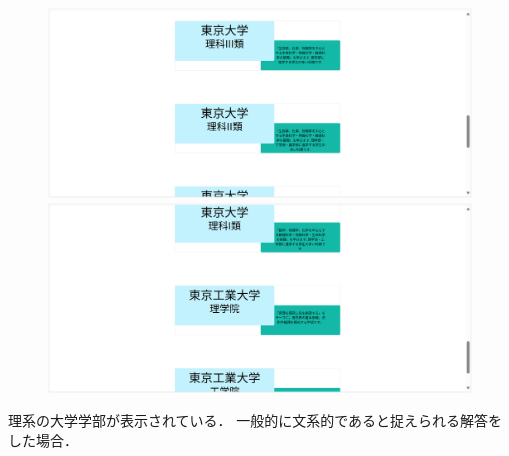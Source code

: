 \documentclass[a4j, titlepage]{jarticle}
\begin{document}
\begin{figure}[htbp]
  \centering
\includegraphics[scale=0.15]{dousakekka-7.png}
\includegraphics[scale=0.15]{dousakekka-8.png}
\end{figure}

理系の大学学部が表示されている．
\newpage
一般的に文系的であると捉えられる解答をした場合．
\end{document}
